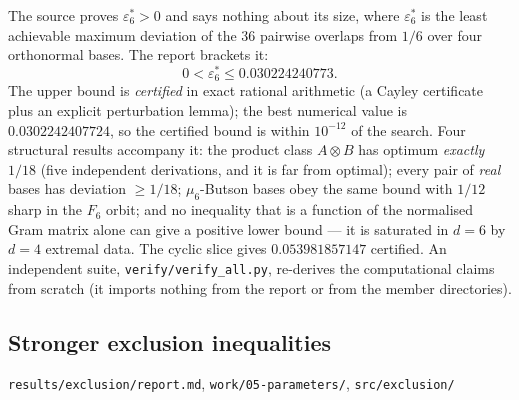 \documentclass[10pt]{article}
\theoremstyle{definition}
\newcommand{\file}[1]{\texttt{\small #1}}
\begin{document}
The source proves $\varepsilon_6^*>0$ and says nothing about its size, where
$\varepsilon_6^*$ is the least achievable maximum deviation of the $36$ pairwise overlaps from $1/6$
over four orthonormal bases. The report brackets it:
\[
0<\varepsilon_6^*\le 0.030224240773 .
\]
The upper bound is \emph{certified} in exact rational arithmetic (a Cayley certificate plus an
explicit perturbation lemma); the best numerical value is $0.0302242407724$, so the certified bound is
within $10^{-12}$ of the search. Four structural results accompany it: the product class
$A\otimes B$ has optimum \emph{exactly} $1/18$ (five independent derivations, and it is far from
optimal); every pair of \emph{real} bases has deviation $\ge1/18$; $\mu_6$-Butson bases obey the same
bound with $1/12$ sharp in the $F_6$ orbit; and no inequality that is a function of the normalised
Gram matrix alone can give a positive lower bound --- it is saturated in $d=6$ by $d=4$ extremal data.
The cyclic slice gives $0.053981857147$ certified. An independent suite, \file{verify/\allowbreak{}verify\_all.py},
re-derives the computational claims from scratch (it imports nothing from the report or from the
member directories).

\subsection{Stronger exclusion inequalities}\label{sec:excl}
\file{results/\allowbreak{}exclusion/\allowbreak{}report.md}, \file{work/\allowbreak{}05-\allowbreak{}parameters/\allowbreak{}}, \file{src/\allowbreak{}exclusion/\allowbreak{}}
\end{document}
